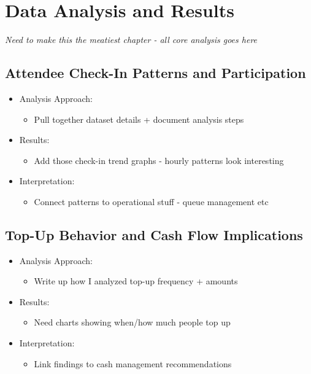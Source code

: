 \chapter{Data Analysis and Results}
\label{ch:data-analysis-and-results}


\textit{Need to make this the meatiest chapter - all core analysis goes here}


\section{Attendee Check-In Patterns and Participation}
\label{sec:data-analysis-attendee-check-in-patterns}
\begin{itemize}
    \item Analysis Approach:
    \begin{itemize}
        \item Pull together dataset details + document analysis steps
    \end{itemize}

    \item Results:
    \begin{itemize}
        \item Add those check-in trend graphs - hourly patterns look interesting
    \end{itemize}

    \item Interpretation:
    \begin{itemize}
        \item Connect patterns to operational stuff - queue management etc
    \end{itemize}
\end{itemize}


\section{Top-Up Behavior and Cash Flow Implications}
\label{sec:data-analysis-top-up-behavior}
\begin{itemize}
    \item Analysis Approach:
    \begin{itemize}
        \item Write up how I analyzed top-up frequency + amounts
    \end{itemize}

    \item Results:
    \begin{itemize}
        \item Need charts showing when/how much people top up
    \end{itemize}

    \item Interpretation:
    \begin{itemize}
        \item Link findings to cash management recommendations
    \end{itemize}
\end{itemize}


